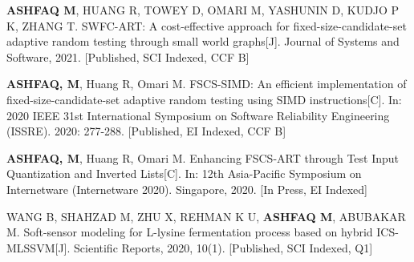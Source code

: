 \documentclass[
12pt, %
oneside, %
english, %
singlespacing, %
headsepline, %
consistentlayout, %
]{MastersDoctoralThesis} %
\begin{document}
\begin{publications}
\addchaptertocentry{\publicationsname}

 
	\begin{enumerate}[start=1,label={[T\arabic*]}]

		\item 	\textbf{ASHFAQ M}, HUANG R, TOWEY D, OMARI M, YASHUNIN D, KUDJO P K, ZHANG T.  SWFC-ART: A cost-effective approach for fixed-size-candidate-set adaptive random testing through small world graphs[J]. Journal of Systems and Software, 2021. 
		[Published, SCI Indexed, CCF B]
		
		
		\item 	\textbf{ASHFAQ, M}, Huang R, Omari M. FSCS-SIMD: An efficient implementation of fixed-size-candidate-set adaptive random testing using SIMD instructions[C].  In: 2020 IEEE 31st International Symposium on Software Reliability Engineering (ISSRE). 2020: 277-288.
		[Published, EI Indexed, CCF B]
		
		
		
		\item 	\textbf{ASHFAQ, M}, Huang R, Omari M. Enhancing FSCS-ART through Test Input Quantization and Inverted Lists[C].  In:  12th Asia-Pacific Symposium on Internetware (Internetware 2020). Singapore, 2020. [In Press, EI Indexed]
		
		\item   WANG B, SHAHZAD M, ZHU X, REHMAN K U, \textbf{ASHFAQ M}, ABUBAKAR M. Soft-sensor modeling for L-lysine fermentation process based on hybrid ICS-MLSSVM[J]. Scientific Reports, 2020, 10(1). [Published, SCI Indexed, Q1]
		
		
    \end{enumerate}
\end{publications}




\appendix %


% 
%
%



\end{document}
